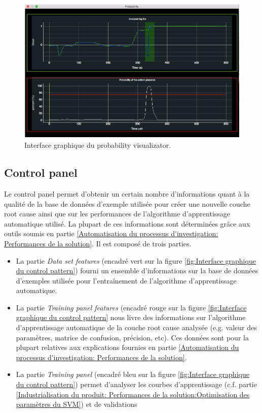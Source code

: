 \begin{figure}[h]
	\centering\includegraphics[height=7cm]{images/proba_visu.png}
	\caption[Interface graphique du probability visualizator]{Interface graphique du probability visualizator.}
	\label{fig:Interface graphique du probability visualizator}
\end{figure}

\subsection{Control panel}
\label{Industrialisation du produit: Outils graphiques: Control panel}
Le control panel permet d'obtenir un certain nombre d'informations quant à la qualité de la base de données d'exemple utilisée pour créer une nouvelle couche root cause ainsi que sur les performances de l'algorithme d'apprentissage automatique utilisé. La plupart de ces informations sont déterminées grâce aux outils soumis en partie \ref{Automatisation du processus d'investigation: Performances de la solution}. Il est composé de trois parties.
\begin{itemize}
	\item La partie \emph{Data set features} (encadré vert sur la figure \ref{fig:Interface graphique du control pattern}) fourni un ensemble d'informations sur la base de données d'exemples utilisée pour l'entraînement de l'algorithme d'apprentissage automatique. 
	\item La partie \emph{Training panel features} (encadré rouge sur la figure \ref{fig:Interface graphique du control pattern} nous livre des informations sur  l'algorithme d'apprentissage automatique de la couche root cause analysée (e.g. valeur des paramètres, matrice de confusion, précision, etc). Ces données sont pour la plupart relatives aux explications fournies en partie \ref{Automatisation du processus d'investigation: Performances de la solution}.
	\item La partie \emph{Training panel} (encadré bleu sur la figure \ref{fig:Interface graphique du control pattern}) permet d'analyser les courbes d'apprentissage (c.f. partie \ref{Industrialisation du produit: Performances de la solution:Optimisation des paramètres du SVM}) et de validations
\end{itemize}

